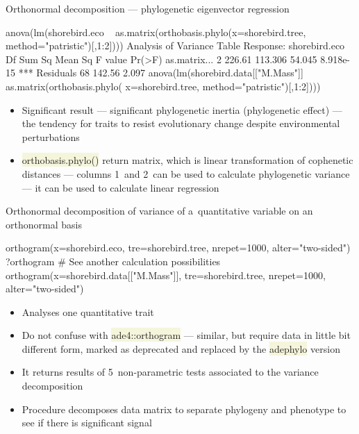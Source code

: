 \documentclass[compress, ucs, xelatex, 11pt, xcolor=svgnames, aspectratio=169,
	hyperref={
		bookmarks=true,
		unicode=true,
		colorlinks=true,
		pdftitle={Molecular data in R},
		plainpages=false,
		pdfauthor={Vojtech Zeisek},
		pdfsubject={Course about phylogeny and evolution in R},
		pdfcreator={XeLaTeX},
		pdfkeywords={R, evolution, phylogeny, molecular data},
		linkcolor=Crimson, %
		anchorcolor=Magenta, %
		citecolor=Magenta, %
		filecolor=Magenta, %
		menucolor=Magenta, %
		urlcolor=DodgerBlue, %
		pdftex},
	url={hyphens, lowtilde} %
	]{beamer}
\renewcommand{\texttt}[1]{\colorbox{Beige}{{\ttfamily #1}}}
\begin{document}
\begin{frame}[fragile]{Orthonormal decomposition --- phylogenetic eigenvector regression}
	\begin{spluscode}
    anova(lm(shorebird.eco ~ as.matrix(orthobasis.phylo(x=shorebird.tree,
      method="patristic")[,1:2])))
    Analysis of Variance Table
    Response: shorebird.eco
                 Df Sum Sq Mean Sq F value    Pr(>F)
    as.matrix...  2 226.61 113.306  54.045 8.918e-15 ***
    Residuals    68 142.56   2.097
    anova(lm(shorebird.data[["M.Mass"]] ~ as.matrix(orthobasis.phylo(
      x=shorebird.tree, method="patristic")[,1:2])))
	\end{spluscode}
	\begin{itemize}
		\item Significant result --- significant phylogenetic inertia (phylogenetic effect) --- the tendency for traits to resist evolutionary change despite environmental perturbations
		\item \texttt{orthobasis.phylo()} return matrix, which is linear transformation of cophenetic distances --- columns 1~and 2~can be used to calculate phylogenetic variance --- it can be used to calculate linear regression
	\end{itemize}
\end{frame}

\begin{frame}[fragile]{Orthonormal decomposition of variance of a~quantitative variable on an orthonormal basis}
	\begin{spluscode}
    orthogram(x=shorebird.eco, tre=shorebird.tree, nrepet=1000,
      alter="two-sided")
    ?orthogram # See another calculation possibilities
    orthogram(x=shorebird.data[["M.Mass"]], tre=shorebird.tree, nrepet=1000,
      alter="two-sided")
	\end{spluscode}
	\begin{itemize}
		\item Analyses one quantitative trait
		\item Do not confuse with \texttt{ade4::orthogram} --- similar, but require data in little bit different form, marked as deprecated and replaced by the \texttt{adephylo} version
		\item It returns results of 5~non-parametric tests associated to the variance decomposition
		\item Procedure decomposes data matrix to separate phylogeny and phenotype to see if there is significant signal
	\end{itemize}
\end{frame}
\end{document}
